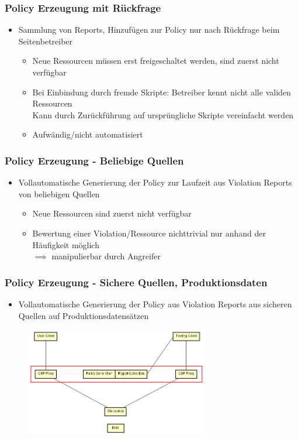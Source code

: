 \documentclass[handout]{beamer}
\begin{document}
\begin{frame}[c]
\frametitle{Policy Erzeugung mit Rückfrage}
\begin{itemize}
\item Sammlung von Reports, Hinzufügen zur Policy nur nach Rückfrage beim Seitenbetreiber
\begin{itemize}
\item Neue Ressourcen müssen erst freigeschaltet werden, sind zuerst nicht verfügbar
\item Bei Einbindung durch fremde Skripte: Betreiber kennt nicht alle validen Ressourcen\\
Kann durch Zurückführung auf ursprüngliche Skripte vereinfacht werden
\item Aufwändig/nicht automatisiert
\end{itemize}
\end{itemize}
\end{frame}

\begin{frame}[c]
\frametitle{Policy Erzeugung - Beliebige Quellen}
\begin{itemize}
\item Vollautomatische Generierung der Policy zur Laufzeit aus Violation Reports von beliebigen Quellen
\begin{itemize}
\item Neue Ressourcen sind zuerst nicht verfügbar
\item Bewertung einer Violation/Ressource nichttrivial nur anhand der Häufigkeit möglich \\$\implies$ manipulierbar durch Angreifer
\end{itemize}
\end{itemize}
\end{frame}

\begin{frame}
\frametitle{Policy Erzeugung - Sichere Quellen, Produktionsdaten}
\begin{itemize}
\item Vollautomatische Generierung der Policy aus Violation Reports aus sicheren Quellen auf Produktionsdatensätzen
\end{itemize}
\begin{figure}[ht]
	\centering
	\includegraphics[width=8cm]{schema_3.png}
\end{figure}
\end{frame}
\end{document}
